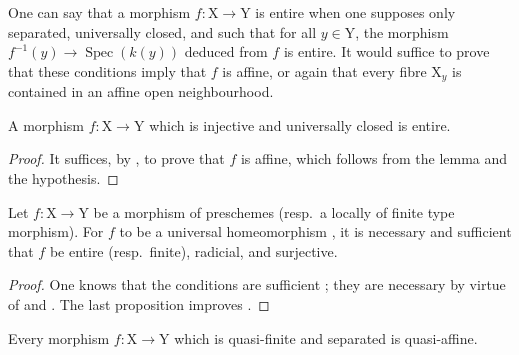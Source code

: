 \begin{remark}[18.12.9]
\label{IV.18.12.9}
One can say that a morphism $f:\mathrm{X}\to\mathrm{Y}$ is entire when one supposes only separated, universally closed, and such that for all $y\in\mathrm{Y}$, the morphism $f^{-1}(y)\to\operatorname{Spec}(k(y))$ deduced from $f$ is entire.
It would suffice to prove that these conditions imply that $f$ is affine, or again that every fibre $\mathrm{X}_y$ is contained in an affine open neighbourhood.
\end{remark}

\begin{corollary}[18.12.10]
\label{IV.18.12.10}
A morphism $f:\mathrm{X}\to\mathrm{Y}$ which is injective and universally closed is entire.
\end{corollary}

\begin{proof}
It suffices, by , to prove that $f$ is affine, which follows from the lemma  and the hypothesis.
\end{proof}

\begin{corollary}[18.12.11]
\label{IV.18.12.11}
Let $f:\mathrm{X}\to\mathrm{Y}$ be a morphism of preschemes (resp.\ a locally of finite type morphism).
For $f$ to be a universal homeomorphism , it is necessary and sufficient that $f$ be entire (resp.\ finite), radicial, and surjective.
\end{corollary}

\begin{proof}
One knows that the conditions are sufficient ; they are necessary by virtue of  and .
The last proposition improves .
\end{proof}

\begin{proposition}[18.12.12]
\label{IV.18.12.12}
Every morphism $f:\mathrm{X}\to\mathrm{Y}$ which is quasi-finite and separated is quasi-affine.
\end{proposition}

